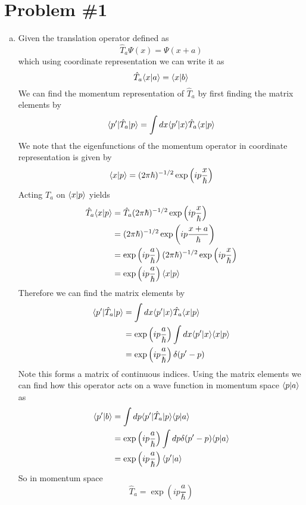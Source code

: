 \documentclass[11pt]{article}
\numberwithin{equation}{section}
\begin{document}


\section{Problem \#1}
\begin{enumerate}[(a)]
\item Given the translation operator defined as
$$\hat{T}_{a}\Psi(x) = \Psi(x+a)$$
which using coordinate representation we can write it as
$$\hat{T}_{a}\langle{x}|{a}\rangle = \langle{x}|{b}\rangle$$
We can find the momentum representation of $\hat{T}_a$ by first finding the matrix elements 
by
$$\langle{p'}|\hat{T}_a|{p}\rangle = \int{dx}\langle{p'}|{x}\rangle\hat{T}_{a}\langle{x}|{p}\rangle$$
We note that the eigenfunctions of the momentum operator in coordinate representation is 
given by
$$\langle{x}|{p}\rangle = (2\pi\hbar)^{-1/2}\exp\left(ip\frac{x}{\hbar}\right)$$
Acting $\hat{T}_a$ on $\langle{x}|{p}\rangle$ yields
\begin{align*}
\hat{T}_{a}\langle{x}|{p}\rangle &= \hat{T}_{a}(2\pi\hbar)^{-1/2}\exp\left(ip\frac{x}{\hbar}\right)\\
&= (2\pi\hbar)^{-1/2}\exp\left(ip\frac{x+a}{\hbar}\right)\\
&= \exp\left(ip\frac{a}{\hbar}\right)(2\pi\hbar)^{-1/2}\exp\left(ip\frac{x}{\hbar}\right)\\
&= \exp\left(ip\frac{a}{\hbar}\right)\langle{x}|{p}\rangle
\end{align*}
Therefore we can find the matrix elements by
\begin{align*}
\langle{p'}|\hat{T}_a|{p}\rangle &= \int{dx}\langle{p'}|{x}\rangle\hat{T}_{a}\langle{x}|{p}\rangle\\
&= \exp\left(ip\frac{a}{\hbar}\right)\int{dx}\langle{p'}|{x}\rangle\langle{x}|{p}\rangle\\
&= \exp\left(ip\frac{a}{\hbar}\right)\delta(p'-p)
\end{align*}
Note this forms a matrix of continuous indices. Using the matrix elements we can find how
this operator acts on a wave function in momentum space $\langle{p}|{a}\rangle$ as
\begin{align*}
\langle{p'}|{b}\rangle &= \int{dp}\langle{p'}|\hat{T}_{a}|{p}\rangle\langle{p}|{a}\rangle\\
&= \exp\left(ip\frac{a}{\hbar}\right)\int{dp}\delta(p'-p)\langle{p}|{a}\rangle\\
&= \exp\left(ip\frac{a}{\hbar}\right)\langle{p'}|{a}\rangle\\
\end{align*}
So in momentum space 
$$\hat{T}_{a} = \exp\left(ip\frac{a}{\hbar}\right)$$


\end{enumerate}
\end{document}
